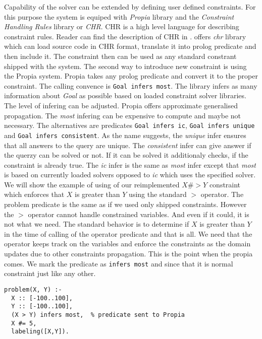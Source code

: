Capability of the solver can be extended by defining user defined constraints. For this
purpose the system is equiped with {\em Propia} library and the {\em Constraint Handling Rules}
library or {\em CHR}. CHR is a high level language for describing constraint rules. Reader can find
the description of CHR in \cite{fru_chr_book_2009}.
\eclipse offers {\em chr} library which can load source code in CHR format, translate it
into prolog predicate and then include it. The constraint then can be used as any standard
constrant shipped with the system.
The second way to introduce new constraint is using the Propia system. Propia takes 
any prolog predicate and convert it to the proper constraint.
The calling convence is \texttt{Goal infers most}. The library infers as many information about {\em Goal} 
as possible based on loaded constraint solver libraries. The level of infering can be adjusted.
Propia offers approximate generalised propagation. The {\em most} infering can be expensive 
to compute and maybe not necessary. The alternatives are predicates \texttt{Goal infers ic}, 
\texttt{Goal infers unique} and \texttt{Goal infers consistent}. As the name suggests, the {\em unique} 
infer ensures that all answers to the query are unique. The {\em consistent} infer can give
answer if the querzy can be solved or not. If it can be solved it additionaly checks, if the
constraint is already true. The {\em ic} infer is the same as {\em most} infer except that
{\em most} is based on currently loaded solvers opposed to {\em ic} which uses the specified solver.
We will show the example of using of our reimplemented $X \#> Y$ constraint which 
enforces that $X$ is greater than $Y$ using the standard $>$ operator. The problem predicate is the same 
as if we used only shipped constraints. However the $>$ operator cannot handle constrained
variables. And even if it could, it is not what we need. The standard behavior is to 
determine if $X$ is greater than $Y$ in the time of calling of the operator predicate and
that is all. We need that the operator keeps track on the variables and enforce the constraints
as the domain updates due to other constraints propagation. This is the point when the propia
comes. We mark the predicate as \texttt{infers most} and since that it is normal
constraint just like any other.

\begin{verbatim}
problem(X, Y) :-
  X :: [-100..100], 
  Y :: [-100..100], 
  (X > Y) infers most,  % predicate sent to Propia   
  X #= 5, 
  labeling([X,Y]).
\end{verbatim}

